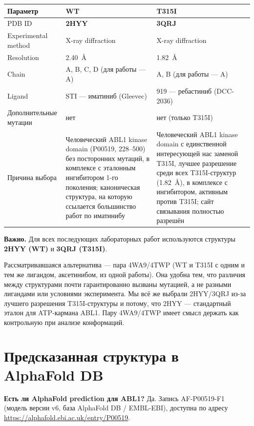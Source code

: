 \documentclass[12pt,a4paper]{article}
\newcommand{\code}[1]{{\ttfamily #1}}
\begin{document}
\begin{center}
\begin{tabular}{L{3.2cm}L{5.5cm}L{5.5cm}}
\toprule
\textbf{Параметр} & \textbf{WT} & \textbf{T315I} \\
\midrule
PDB ID & \textbf{2HYY} & \textbf{3QRJ} \\
Experimental method & X-ray diffraction & X-ray diffraction \\
Resolution & 2.40~\AA & 1.82~\AA \\
Chain & A, B, C, D (для работы --- A) & A, B (для работы --- A) \\
Ligand & STI --- иматиниб (Gleevec) & 919 --- ребастиниб (DCC-2036) \\
Дополнительные мутации & нет & нет (только T315I) \\
Причина выбора & Человеческий ABL1 kinase domain (P00519, 228--500) без посторонних мутаций, в комплексе с эталонным ингибитором 1-го поколения; каноническая структура, на которую ссылается большинство работ по иматинибу & Человеческий ABL1 kinase domain с единственной интересующей нас заменой T315I, лучшее разрешение среди всех T315I-структур (1.82~\AA), в комплексе с ингибитором, активным против T315I; сайт связывания полностью разрешён \\
\bottomrule
\end{tabular}
\end{center}

\medskip
\noindent\textbf{Важно.} Для всех последующих лабораторных работ используются структуры
\textbf{2HYY (WT)} и \textbf{3QRJ (T315I)}.

\medskip
\noindent Рассматривавшаяся альтернатива --- пара \code{4WA9}/\code{4TWP} (WT и T315I
с одним и тем же лигандом, аксетинибом, из одной работы). Она удобна тем, что различия
между структурами почти гарантированно вызваны мутацией, а не разными лигандами или
условиями эксперимента. Мы всё же выбрали \code{2HYY}/\code{3QRJ} из-за лучшего
разрешения T315I-структуры и потому, что 2HYY --- стандартный эталон для ATP-кармана
ABL1. Пару 4WA9/4TWP имеет смысл держать как контрольную при анализе конформаций.

\section{Предсказанная структура в AlphaFold DB}

\textbf{Есть ли AlphaFold prediction для ABL1?} Да. Запись \code{AF-P00519-F1}
(модель версии v6, база AlphaFold DB / EMBL-EBI), доступна по адресу
\url{https://alphafold.ebi.ac.uk/entry/P00519}.
\end{document}
